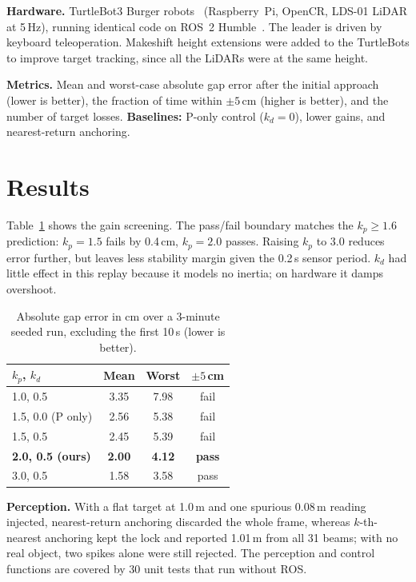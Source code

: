 \documentclass[11pt,a4paper,twocolumn]{article}
\begin{document}
\textbf{Hardware.} TurtleBot3 Burger robots~\cite{turtlebot3manual} (Raspberry~Pi,
OpenCR, LDS-01 LiDAR at 5\,Hz), running identical code on ROS~2 Humble~\cite{ros2docs}. The
leader is driven by keyboard teleoperation. Makeshift height extensions were added to the
TurtleBots to improve target tracking, since all the LiDARs were at the same height.

\textbf{Metrics.} Mean and worst-case absolute gap error after the initial approach (lower is
better), the fraction of time within $\pm5$\,cm (higher is better), and the number of target
losses. \textbf{Baselines:} P-only control ($k_d{=}0$), lower gains, and nearest-return
anchoring.

\section{Results}
Table~\ref{tab:results} shows the gain screening. The pass/fail boundary matches the
$k_p\ge1.6$ prediction: $k_p{=}1.5$ fails by 0.4\,cm, $k_p{=}2.0$ passes. Raising $k_p$ to
3.0 reduces error further, but leaves less stability margin given the 0.2\,s sensor period.
$k_d$ had little effect in this replay because it models no inertia; on hardware it damps
overshoot.

\begin{table}[t]
\centering
\small
\begin{tabular}{lccc}
\toprule
$k_p$, $k_d$ & Mean & Worst & $\pm5$\,cm \\
\midrule
1.0, 0.5 & 3.35 & 7.98 & fail \\
1.5, 0.0 (P only) & 2.56 & 5.38 & fail \\
1.5, 0.5 & 2.45 & 5.39 & fail \\
\textbf{2.0, 0.5 (ours)} & \textbf{2.00} & \textbf{4.12} & \textbf{pass} \\
3.0, 0.5 & 1.58 & 3.58 & pass \\
\bottomrule
\end{tabular}
\caption{Absolute gap error in cm over a 3-minute seeded run, excluding the first 10\,s
(lower is better).}
\label{tab:results}
\end{table}

\textbf{Perception.} With a flat target at 1.0\,m and one spurious 0.08\,m reading injected,
nearest-return anchoring discarded the whole frame, whereas $k$-th-nearest anchoring kept the
lock and reported 1.01\,m from all 31 beams; with no real object, two spikes alone were still
rejected. The perception and control functions are covered by 30 unit tests that run without
ROS.
\end{document}
